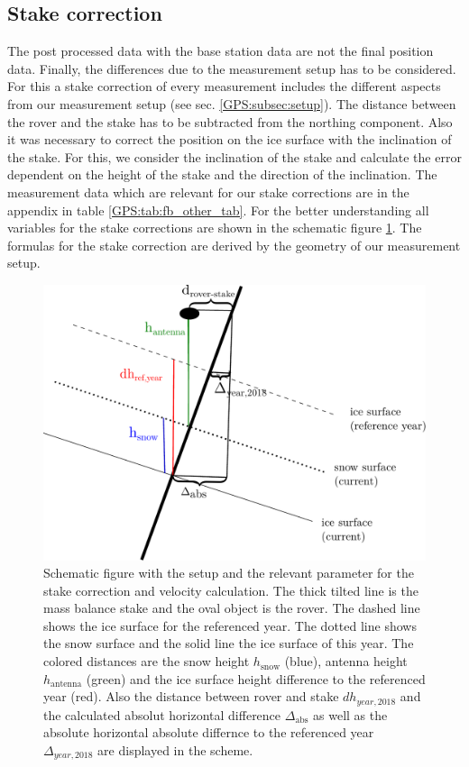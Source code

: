 \subsection{Stake correction}
The post processed data with the base station data are not the final position data. 
Finally, the differences due to the measurement setup has to be considered.
For this a stake correction of every measurement includes the different aspects from our measurement setup (see sec. \ref{GPS:subsec:setup}).
The distance between the rover and the stake has to be subtracted from the northing component.
Also it was necessary to correct the position on the ice surface with the inclination of the stake. 
For this, we consider the inclination of the stake and calculate the error dependent on the height of the stake and the direction of the inclination.
The measurement data which are relevant for our stake corrections are in the appendix in table \ref{GPS:tab:fb_other_tab}.
For the better understanding all variables for the stake corrections are shown in the schematic figure \ref{GPS:fig:scheme}.
The formulas for the stake correction are derived by the geometry of our measurement setup.

\begin{figure}[H]
	\centering
	\includegraphics[width=0.9\linewidth]{./figs/pictures/schematic_setup.pdf}
	\caption{Schematic figure with the setup and the relevant parameter for the stake correction and velocity calculation. The thick tilted line is the mass balance stake and the oval object is the rover. The dashed line shows the ice surface for the referenced year. The dotted line shows the snow surface and the solid line the ice surface of this year. The colored distances are the snow height $h_{\text{snow}}$ (blue), antenna height $h_{\text{antenna}}$ (green) and the ice surface height difference to the referenced year (red). Also the distance between rover and stake $dh_{year,2018}$ and the calculated absolut horizontal difference $\Delta_{\text{abs}}$ as well as the absolute horizontal absolute differnce to the referenced year $\Delta_{year,2018}$ are displayed in the scheme.}
	\label{GPS:fig:scheme}
\end{figure}

